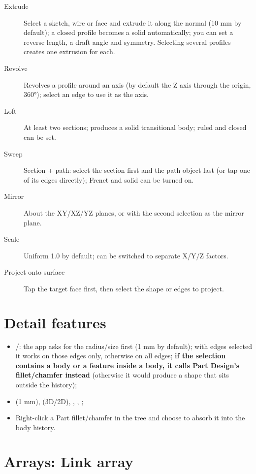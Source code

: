 \begin{description}
  \item[Extrude] Select a sketch, wire or face and extrude it along the normal (10 mm by default); a closed profile becomes a solid automatically; you can set a reverse length, a draft angle and symmetry. Selecting several profiles creates one extrusion for each.
  \item[Revolve] Revolves a profile around an axis (by default the Z axis through the origin, 360°); select an edge to use it as the axis.
  \item[Loft] At least two sections; produces a solid transitional body; ruled and closed can be set.
  \item[Sweep] Section + path: select the section first and the path object last (or tap one of its edges directly); Frenet and solid can be turned on.
  \item[Mirror] About the XY/XZ/YZ planes, or with the second selection as the mirror plane.
  \item[Scale] Uniform 1.0 by default; can be switched to separate X/Y/Z factors.
  \item[Project onto surface] Tap the target face first, then select the shape or edges to project.
\end{description}

\section{Detail features}

\begin{itemize}
  \item {}/: the app asks for the radius/size first (1 mm by default); with edges selected it works
        on those edges only, otherwise on all edges; \textbf{if the selection contains a body or a feature inside a body,
        it calls Part Design's fillet/chamfer instead} (otherwise it would produce a shape that sits outside the history);
  \item {} (1 mm),  (3D/2D), , , ;
  \item Right-click a Part fillet/chamfer in the tree and choose  to absorb it into the body history.
\end{itemize}

\section{Arrays: Link array}

